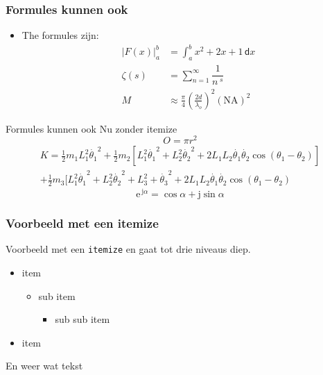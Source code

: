 \documentclass[fleqn,aspectratio=169,dutch]{beamer}
\begin{document}
\begin{frame}
\frametitle{Formules kunnen ook}
\begin{itemize}
\item The formules zijn:
\begin{align*}
\left|F(x)\right|^b_a &= \int_a^b x^2 + 2x + 1 \, \mathsf{d} x \\
\zeta (s) &= \sum_{n=1}^\infty \dfrac{1}{n^{\;\!s}} \\
M&\approx\frac{\pi}{4}\left(\frac{2d}{\lambda_o}\right)^2\left(\mathrm{NA}\right)^2
\end{align*}
\end{itemize}
\end{frame}

\begin{frame}{Formules kunnen ook}
Nu zonder itemize
\begin{equation*}
O=\pi r^2
\end{equation*}
\begin{multline*}  
K=\displaystyle{\frac{1}{2}m_1 L_1^2 \dot{\theta_1}^2+\frac{1}{2} m_2[L_1^2 \dot{\theta_1}^2+L_2^2 \dot{\theta_2}^2+2 L_1 L_2 \dot{\theta_1}\dot{\theta_2}\cos(\theta_1-\theta_2)]} \\
 \displaystyle{+\frac{1}{2}m_3[L_1^2 \dot{\theta_1}^2+L_2^2 \dot{\theta_2}^2+L_3^2+ \dot{\theta_3}^2+2 L_1 L_2 \dot{\theta_1}\dot{\theta_2}\cos(\theta_1-\theta_2)}
\end{multline*}
\begin{equation*}
\mathrm{e}^{\, \mathrm{j}\alpha} = \cos \alpha + \mathrm{j} \sin \alpha
\end{equation*}
\end{frame}

\begin{frame}
\frametitle{Voorbeeld met een itemize}
Voorbeeld met een \texttt{itemize} en gaat tot drie niveaus diep.
\begin{itemize}
\item item
\begin{itemize}
\item sub item
\begin{itemize}
\item sub sub item
\end{itemize}
\end{itemize}
\item item
\end{itemize}
En weer wat tekst
\end{frame}
\end{document}
